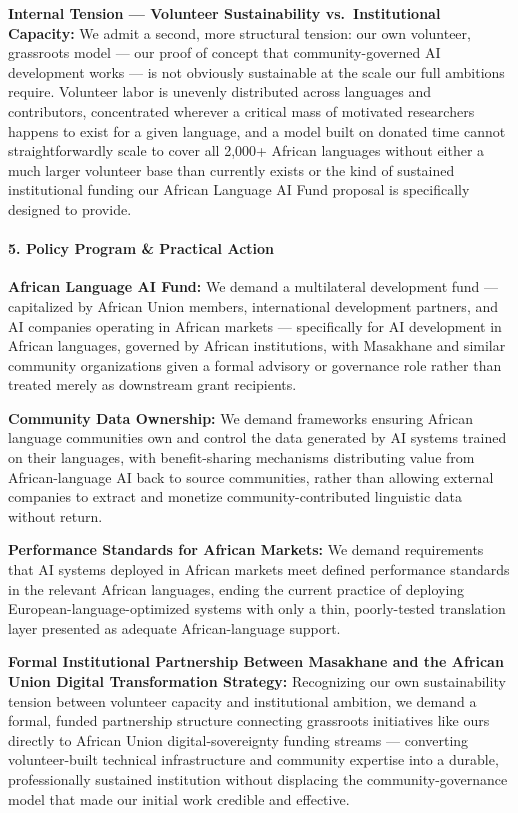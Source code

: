 \textbf{Internal Tension --- Volunteer Sustainability vs.~Institutional
Capacity:} We admit a second, more structural tension: our own
volunteer, grassroots model --- our proof of concept that
community-governed AI development works --- is not obviously sustainable
at the scale our full ambitions require. Volunteer labor is unevenly
distributed across languages and contributors, concentrated wherever a
critical mass of motivated researchers happens to exist for a given
language, and a model built on donated time cannot straightforwardly
scale to cover all 2,000+ African languages without either a much larger
volunteer base than currently exists or the kind of sustained
institutional funding our African Language AI Fund proposal is
specifically designed to provide.

\paragraph{5. Policy Program \& Practical
Action}\label{policy-program-practical-action-48}

\textbf{African Language AI Fund:} We demand a multilateral development
fund --- capitalized by African Union members, international development
partners, and AI companies operating in African markets --- specifically
for AI development in African languages, governed by African
institutions, with Masakhane and similar community organizations given a
formal advisory or governance role rather than treated merely as
downstream grant recipients.

\textbf{Community Data Ownership:} We demand frameworks ensuring African
language communities own and control the data generated by AI systems
trained on their languages, with benefit-sharing mechanisms distributing
value from African-language AI back to source communities, rather than
allowing external companies to extract and monetize
community-contributed linguistic data without return.

\textbf{Performance Standards for African Markets:} We demand
requirements that AI systems deployed in African markets meet defined
performance standards in the relevant African languages, ending the
current practice of deploying European-language-optimized systems with
only a thin, poorly-tested translation layer presented as adequate
African-language support.

\textbf{Formal Institutional Partnership Between Masakhane and the
African Union Digital Transformation Strategy:} Recognizing our own
sustainability tension between volunteer capacity and institutional
ambition, we demand a formal, funded partnership structure connecting
grassroots initiatives like ours directly to African Union
digital-sovereignty funding streams --- converting volunteer-built
technical infrastructure and community expertise into a durable,
professionally sustained institution without displacing the
community-governance model that made our initial work credible and
effective.


